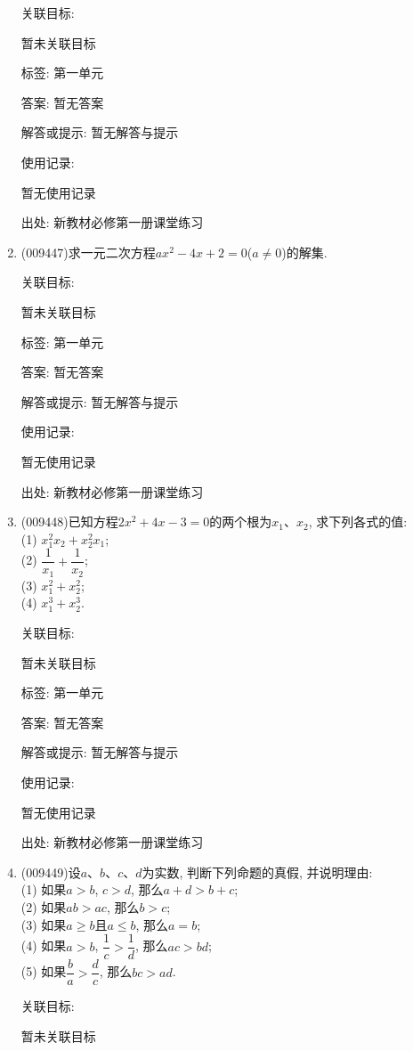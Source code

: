 \documentclass[10pt,a4paper]{article}
\begin{document}
\begin{enumerate}[1.]
关联目标:

暂未关联目标



标签: 第一单元

答案: 暂无答案

解答或提示: 暂无解答与提示

使用记录:

暂无使用记录


出处: 新教材必修第一册课堂练习
\item { (009447)}求一元二次方程$ax^2-4x+2=0$($a\ne 0$)的解集.


关联目标:

暂未关联目标



标签: 第一单元

答案: 暂无答案

解答或提示: 暂无解答与提示

使用记录:

暂无使用记录


出处: 新教材必修第一册课堂练习
\item { (009448)}已知方程$2x^2+4x-3=0$的两个根为$x_1$、$x_2$, 求下列各式的值:\\
(1) $x_1^2x_2+x_2^2x_1$;\\
(2) $\dfrac1{x_1}+\dfrac1{x_2}$;\\
(3) $x_1^2+x_2^2$;\\
(4) $x_1^3+x_2^3$.


关联目标:

暂未关联目标



标签: 第一单元

答案: 暂无答案

解答或提示: 暂无解答与提示

使用记录:

暂无使用记录


出处: 新教材必修第一册课堂练习
\item { (009449)}设$a$、$b$、$c$、$d$为实数, 判断下列命题的真假, 并说明理由:\\
(1) 如果$a>b$, $c>d$, 那么$a+d>b+c$;\\
(2) 如果$ab>ac$, 那么$b>c$;\\
(3) 如果$a\ge b$且$a\le b$, 那么$a=b$;\\
(4) 如果$a>b$, $\dfrac 1c>\dfrac 1d$, 那么$ac>bd$;\\
(5) 如果$\dfrac ba>\dfrac dc$, 那么$bc>ad$.


关联目标:

暂未关联目标




\end{enumerate}
\end{document}
